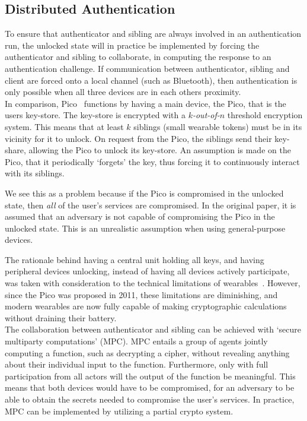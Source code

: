 \subsection{Distributed Authentication}


To ensure that \gls{authenticator} and \gls{sibling} are always involved in an authentication run, the unlocked state will in practice be implemented by forcing the \gls{authenticator} and \gls{sibling} to collaborate, in computing the response to an authentication challenge. If communication between \gls{authenticator}, \gls{sibling} and \gls{client} are forced onto a local channel (such as Bluetooth), then authentication is only possible when all three devices are in each others proximity.\\

In comparison, Pico~\cite{stajano2011pico} functions by having a main device, the Pico, that is the users key-store. The key-store is encrypted with a \textit{$k$-out-of-$n$} threshold encryption system. This means that at least $k$ siblings (small wearable tokens) must be in its vicinity for it to unlock. On request from the Pico, the siblings send their key-share, allowing the Pico to unlock its key-store. An assumption is made on the Pico, that it periodically `forgets' the key, thus forcing it to continuously interact with its siblings.

We see this as a problem because if the Pico is compromised in the unlocked state, then \textit{all} of the user's services are compromised. In the original paper, it is assumed that an adversary is not capable of compromising the Pico in the unlocked state. This is an unrealistic assumption when using general-purpose devices.

The rationale behind having a central unit holding all keys, and having peripheral devices unlocking, instead of having all devices actively participate, was taken with consideration to the technical limitations of wearables~\cite{stannard2012good}. However, since the Pico was proposed in 2011, these limitations are diminishing, and modern wearables are now fully capable of making cryptographic calculations without draining their battery.\\

The collaboration between \gls{authenticator} and \gls{sibling} can be achieved with `secure multiparty computations' (MPC). MPC entails a group of agents jointly computing a function, such as decrypting a cipher, without revealing anything about their individual input to the function. Furthermore, only with full participation from all actors will the output of the function be meaningful. This means that both devices would have to be compromised, for an adversary to be able to obtain the secrets needed to compromise the user's services. In practice, MPC can be implemented by utilizing a partial crypto system.\\






